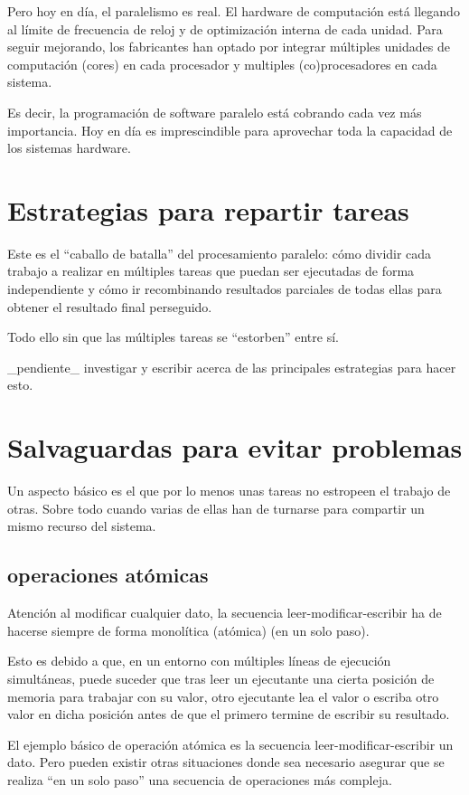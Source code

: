 \documentclass[spanish,12pt,a4paper,final,oneside]{book}
\begin{document}
Pero hoy en día, el paralelismo es real. El hardware de computación está llegando al límite de frecuencia de reloj y de optimización interna de cada unidad. Para seguir mejorando, los fabricantes han optado por integrar múltiples unidades de computación (cores) en cada procesador y multiples (co)procesadores en cada sistema.

Es decir, la programación de software paralelo está cobrando cada vez más importancia. Hoy en día es imprescindible para aprovechar toda la capacidad de los sistemas hardware.



\section{Estrategias para repartir tareas}
Este es el ``caballo de batalla'' del procesamiento paralelo: cómo dividir cada trabajo a realizar en múltiples tareas que puedan ser ejecutadas de forma independiente y cómo ir recombinando resultados parciales de todas ellas para obtener el resultado final perseguido.

Todo ello sin que las múltiples tareas se ``estorben'' entre sí.

\_pendiente\_ investigar y escribir acerca de las principales estrategias para hacer esto.


\section{Salvaguardas para evitar problemas}

Un aspecto básico es el que por lo menos unas tareas no estropeen el trabajo de otras. Sobre todo cuando varias de ellas han de turnarse para compartir un mismo recurso del sistema.

\subsection{operaciones atómicas}
Atención al modificar cualquier dato, la secuencia leer-modificar-escribir ha de hacerse siempre de forma monolítica (atómica) (en un solo paso).

Esto es debido a que, en un entorno con múltiples líneas de ejecución simultáneas, puede suceder que tras leer un ejecutante una cierta posición de memoria para trabajar con su valor, otro ejecutante lea el valor o escriba otro valor en dicha posición antes de que el primero termine de escribir su resultado. 

El ejemplo básico de operación atómica es la secuencia leer-modificar-escribir un dato. Pero pueden existir otras situaciones donde sea necesario asegurar que se realiza ``en un solo paso'' una secuencia de operaciones más compleja. 
\end{document}
